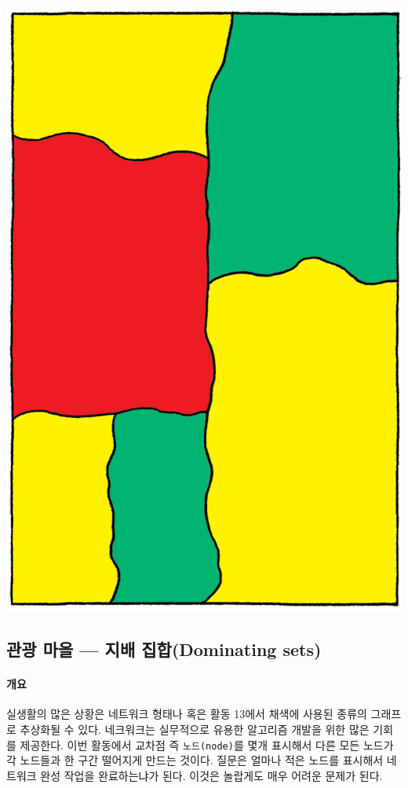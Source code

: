 \documentclass[]{article}
\begin{document}
\includegraphics{csunplugged/04-part/img/ch14-coloring/13-coloring-10-solution.png}

\subsection{관광 마을 --- 지배 집합(Dominating
sets)}\label{mdash--dominating-sets}

\mbox{}\paragraph{개요}\label{section-198}

실생활의 많은 상황은 네트워크 형태나 혹은 활동 13에서 채색에 사용된
종류의 그래프로 추상화될 수 있다. 네크워크는 실무적으로 유용한 알고리즘
개발을 위한 많은 기회를 제공한다. 이번 활동에서 교차점 즉
\texttt{노드(node)}를 몇개 표시해서 다른 모든 노드가 각 노드들과 한 구간
떨어지게 만드는 것이다. 질문은 얼마나 적은 노드를 표시해서 네트워크 완성
작업을 완료하는냐가 된다. 이것은 놀랍게도 매우 어려운 문제가 된다.
\end{document}
